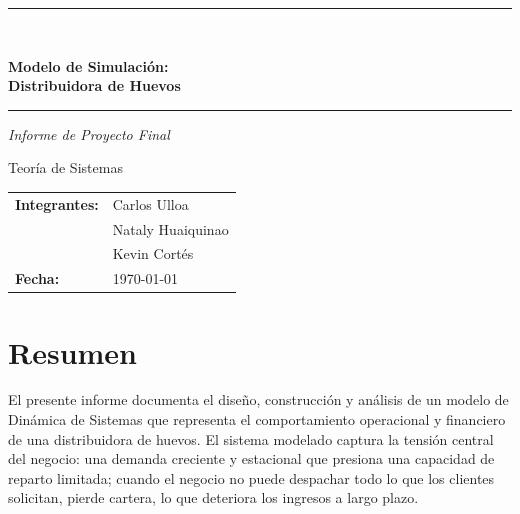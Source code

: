 \documentclass[10pt,a4paper]{article}
\begin{document}
\begin{titlepage}
  \centering
  \vspace{2cm}
  \rule{\linewidth}{1.5pt}\\[6pt]
  {\huge \bfseries \color{azul}
    Modelo de Simulación:\\[4pt]
    Distribuidora de Huevos
  \par}
  \rule{\linewidth}{1.5pt}

  \vspace{1cm}
  {\large \textit{Informe de Proyecto Final} \par}
  {\large Teoría de Sistemas \par}

  \vspace{2cm}
  \begin{tabular}{ll}
    \textbf{Integrantes:} & Carlos Ulloa \\
                          & Nataly Huaiquinao \\
                          & Kevin Cortés \\[8pt]
    \textbf{Fecha:}       & \today \\
  \end{tabular}
\end{titlepage}

\tableofcontents
\newpage

\section{Resumen}

El presente informe documenta el diseño, construcción y análisis de un modelo de Dinámica de Sistemas que representa el comportamiento operacional y financiero de una distribuidora de huevos. El sistema modelado captura la tensión central del negocio: una demanda creciente y estacional que presiona una capacidad de reparto limitada; cuando el negocio no puede despachar todo lo que los clientes solicitan, pierde cartera, lo que deteriora los ingresos a largo plazo.
\end{document}
